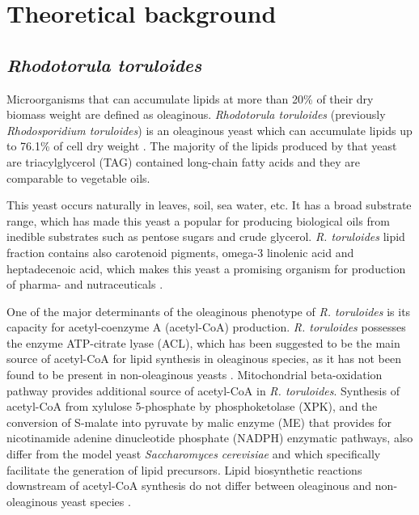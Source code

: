 \chapter{Theoretical background}

\section{\textit{Rhodotorula toruloides}} 

Microorganisms that can accumulate lipids at more than 20\%
of their dry biomass weight are defined as oleaginous. \textit{Rhodotorula toruloides} (previously \textit{Rhodosporidium toruloides}) is an oleaginous yeast
which can accumulate lipids up to 76.1\% of cell dry weight \cite{Li2007}. The majority of the lipids produced by that yeast are
triacylglycerol (TAG) contained long-chain fatty acids and they
are comparable to vegetable oils. \cite{Li2007}

This yeast occurs naturally in leaves, soil, sea water, etc. It has a broad substrate range, 
which has made this yeast a popular for producing biological oils from inedible 
substrates such as pentose sugars and crude glycerol. \cite{Tiukova2019} 
\textit{R. toruloides} lipid fraction contains also carotenoid pigments, 
omega-3 linolenic acid and heptadecenoic acid,
which makes this yeast a promising organism for production of pharma- and nutraceuticals \cite{Buzzini2007}. 

One of the major determinants of the oleaginous phenotype of \textit{R. toruloides} is its capacity for acetyl-coenzyme A (acetyl-CoA) production. 
\textit{R. toruloides} possesses the enzyme ATP-citrate lyase (ACL), 
which has been suggested to be the main source of acetyl-CoA for lipid
synthesis in oleaginous species, as it has not been found to be present in non-oleaginous yeasts \cite{Vorapreeda2012}. Mitochondrial beta-oxidation pathway provides additional source of acetyl-CoA in \textit{R. toruloides}. \cite{Tiukova2019}
Synthesis of acetyl-CoA from xylulose 5-phosphate by phosphoketolase (XPK), and the conversion of S-malate into pyruvate by 
malic enzyme (ME) that provides for nicotinamide adenine dinucleotide phosphate (NADPH) enzymatic pathways, also differ from the model yeast \textit{Saccharomyces
cerevisiae} and which specifically facilitate the generation of lipid precursors.\cite{Rekena2023}
Lipid biosynthetic reactions downstream of acetyl-CoA synthesis do not differ between oleaginous and non-oleaginous 
yeast species \cite{Tiukova2019}.

